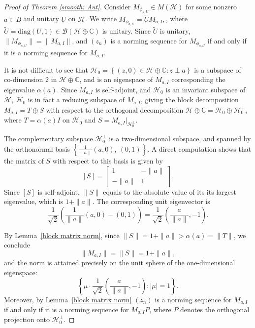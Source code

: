 \documentclass[10pt,a4paper]{amsart}
\renewcommand{\H}{\mathcal{H}}
\begin{document}
\begin{proof}[Proof of Theorem \ref{smooth: Aut}]
Consider $M_{\phi_{a,U}} \in M(\mathcal{H})$ for some nonzero 
$a \in B$ and unitary $U$ on $\mathcal{H}$. We write $M_{\phi_{a,U}} = \widetilde{U}M_{a,I},$, where $\widetilde{U} = \mathrm{diag}(U, 1) \in \mathcal{B}(\mathcal{H} \oplus \mathbb{C})$ is unitary. Since $\widetilde{U}$ is unitary, $\|M_{\phi_{a,U}}\| = \|M_{a,I}\|$, and 
$(z_n)$ is a norming sequence for $M_{\phi_{a,U}}$ if and only if it is 
a norming sequence for $M_{a,I}$. 

\medskip

\noindent It is not difficult to see that $\mathcal{H}_0 = \left\{(z, 0) \in \mathcal{H} \oplus \mathbb{C} : z \perp a\right\}$ is a subspace of co-dimension $2$ in $\mathcal{H} \oplus \mathbb{C}$, and is an eigenspace of $M_{a,I}$ corresponding the eigenvalue $\alpha(a)$. Since $M_{a,I}$ 
is self-adjoint, and $\H_0$ is an invariant subspace of $\H$, $\mathcal{H}_0$ is in fact 
a reducing subspace of $M_{a,I}$, giving the block decomposition $M_{a,I} = T\oplus S$ with respect to the orthogonal decomposition $\mathcal{H} \oplus \mathbb{C} = \mathcal{H}_0 \oplus \mathcal{H}_0^\perp$, where $T = \alpha(a)I$ 
on $\mathcal{H}_0$ and $S = M_{a,I}|_{\mathcal{H}_0^\perp}$. 


\medskip

\noindent The complementary subspace $\mathcal{H}_0^\perp$ is 
a two-dimensional subspace, and spanned by the orthonormal basis 
$\left\{\frac{1}{\|a\|}(a, 0),\ (0,1)\right\}$. A direct computation shows that the matrix of $S$ with respect to this basis is given by
\[
[S] = \begin{bmatrix} 1 & -\|a\| \\ -\|a\| & 1 \end{bmatrix}.
\]
Since $[S]$ is self-adjoint, $\|S\|$ equals to the absolute value of its its largest eigenvalue, which is $1 + \|a\|$. The corresponding unit
eigenvector is 
\[
\frac{1}{\sqrt{2}}\left(\frac{1}{\|a\|}(a,0) - 
(0,1)\right) = \frac{1}{\sqrt{2}}\left(\frac{a}{\|a\|}, -1\right).
\]

\medskip

\noindent By Lemma~\ref{block matrix norm}, since 
$\|S\| = 1 + \|a\| > \alpha(a) = \|T\|$, we conclude
\[
\|M_{a,I}\| = \|S\| = 1 + \|a\|,
\]
and the norm is attained precisely on the unit sphere of the one-dimensional eigenspace:
\[
\left\{\mu\cdot\frac{1}{\sqrt{2}}
\left(\frac{a}{\|a\|}, -1\right) : |\mu| = 1\right\}.
\]
Moreover, by Lemma~\ref{block matrix norm} $(z_n)$ is a 
norming sequence for $M_{a,I}$ if and only if it is a norming 
sequence for $M_{a,I}P$, where $P$ denotes the orthogonal projection 
onto $\mathcal{H}_0^\perp$.




\end{proof}
\end{document}
